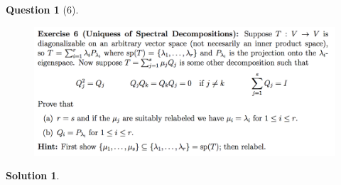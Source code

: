 \documentclass{article} %
\theoremstyle{quest}
\newtheorem*{question}{Question}
\newtheorem*{solution}{Solution}
\begin{document}
\pagebreak

\begin{question}[6]
\hfill
\begin{figure}[h!]
  \centering
    \includegraphics[width=1\textwidth]{LA-1-6.png}
\end{figure}
\end{question}
\begin{solution}
\end{solution}
\end{document}
